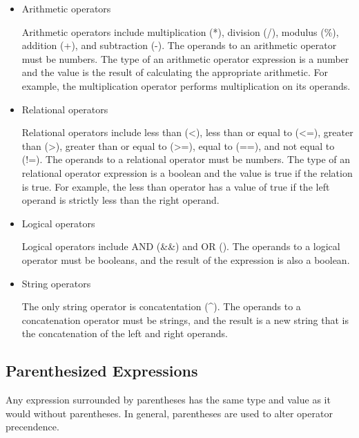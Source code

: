 \documentclass[oneside]{book}
\begin{document}
\begin{itemize}
\item Arithmetic operators

Arithmetic operators include multiplication (*), division (/), modulus (\%), addition (+), and subtraction (-). The operands to an arithmetic operator must be numbers. The type of an arithmetic operator expression is a number and the value is the result of calculating the appropriate arithmetic. For example, the multiplication operator performs multiplication on its operands.

\item Relational operators

Relational operators include less than (\textless), less than or equal to (\textless=), greater than (\textgreater), greater than or equal to (\textgreater=), equal to (==), and not equal to (!=). The operands to a relational operator must be numbers. The type of an relational operator expression is a boolean and the value is true if the relation is true. For example, the less than operator has a value of true if the left operand is strictly less than the right operand.

\item Logical operators

Logical operators include AND (\&\&) and OR (\textbar\textbar). The operands to a logical operator must be booleans, and the result of the expression is also a boolean.

\item String operators

The only string operator is concatentation (\textasciicircum). The operands to a concatenation operator must be strings, and the result is a new string that is the concatenation of the left and right operands.

\end{itemize}

\subsection{Parenthesized Expressions}

Any expression surrounded by parentheses has the same type and value as it would without parentheses. In general, parentheses are used to alter operator precendence.
\end{document}
